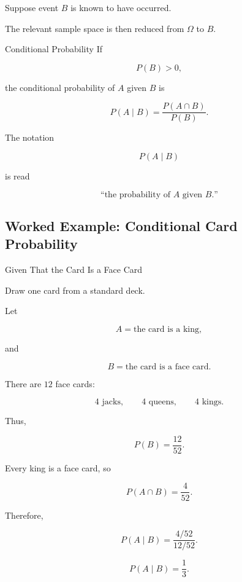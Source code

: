 Suppose event \(B\) is known to have occurred.

The relevant sample space is then reduced from \(\Omega\) to \(B\).

\begin{definitionbox}{Conditional Probability}
If

\[
P(B)>0,
\]

the conditional probability of \(A\) given \(B\) is

\[
\boxed{
P(A\mid B)
=
\frac{P(A\cap B)}{P(B)}.
}
\]
\end{definitionbox}

The notation

\[
P(A\mid B)
\]

is read

\[
\text{``the probability of \(A\) given \(B\).''}
\]

\subsection{Worked Example: Conditional Card Probability}
\label{subsec:worked-conditional-card}

\begin{workedexamplebox}{Given That the Card Is a Face Card}

Draw one card from a standard deck.

Let

\[
A
=
\text{the card is a king},
\]

and

\[
B
=
\text{the card is a face card}.
\]

There are \(12\) face cards:

\[
4\text{ jacks},
\qquad
4\text{ queens},
\qquad
4\text{ kings}.
\]

Thus,

\[
P(B)=\frac{12}{52}.
\]

Every king is a face card, so

\[
P(A\cap B)=\frac4{52}.
\]

Therefore,

\[
P(A\mid B)
=
\frac{4/52}{12/52}.
\]

\begin{answerbox}
\[
\boxed{
P(A\mid B)=\frac13.
}
\]
\end{answerbox}

\end{workedexamplebox}

